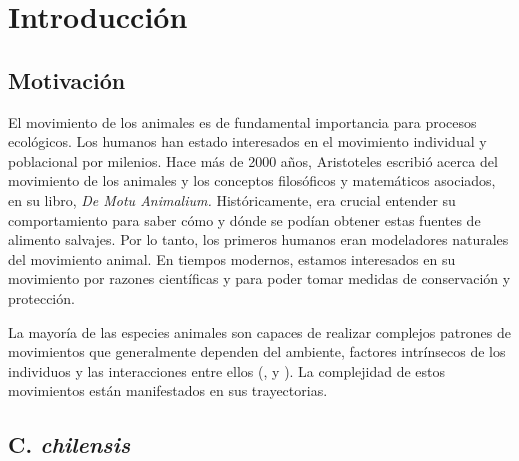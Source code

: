\chapter{Introducción}
 
\section{Motivación}
El movimiento de los animales es de fundamental importancia para procesos ecológicos. Los humanos han estado interesados en el movimiento individual y poblacional por milenios. Hace más de 2000 años, Aristoteles escribió acerca del movimiento de los animales y los conceptos filosóficos y matemáticos asociados, en su libro, \textit{De Motu Animalium.} Históricamente, era crucial entender su comportamiento para saber cómo y dónde se podían obtener estas fuentes de alimento salvajes. Por lo tanto, los primeros humanos eran modeladores naturales del movimiento animal.  En tiempos modernos, estamos interesados en su movimiento por razones científicas y para poder tomar medidas de conservación y protección.
 
 
 
La mayoría de las especies animales son capaces de realizar complejos patrones de movimientos que generalmente dependen del ambiente, factores intrínsecos de los individuos y las interacciones entre ellos (\cite{morales2005adaptive}, \cite{morales2010building} y \cite{nathan2008emerging}). La complejidad de estos movimientos están manifestados en sus trayectorias. %
 
 
 
\section{ C. \textit{chilensis} }
\label{C chilensis}
 

